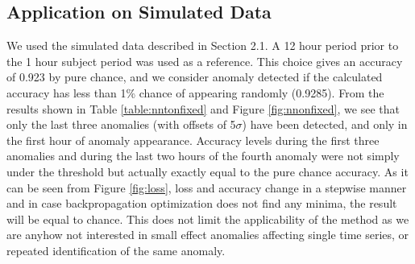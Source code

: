 \documentclass[5p]{elsarticle}
\begin{document}
\subsection{Application on Simulated Data}

We used the simulated data described in Section 2.1. A 12 hour  period prior to the 1 hour subject period was used as a reference. This choice gives an accuracy of 0.923 by pure chance, and we consider anomaly detected if the calculated accuracy has less than 1\% chance of appearing randomly (0.9285). From the results shown in Table \ref{table:nntonfixed} and Figure \ref{fig:nnonfixed}, we see that only the last three anomalies (with offsets of 5$\sigma$) have been detected, and only in the first hour of anomaly appearance. Accuracy levels during the first three anomalies and during the last two hours of the fourth anomaly were not simply under the threshold but actually exactly equal to the pure chance accuracy. As it can be seen from Figure \ref{fig:loss}, loss and accuracy change in a stepwise manner and in case backpropagation optimization does not find any minima, the result will be equal to chance. This does not limit the applicability of the method as we are anyhow not interested in small effect anomalies affecting single time series, or repeated identification of the same anomaly. 
\end{document}
